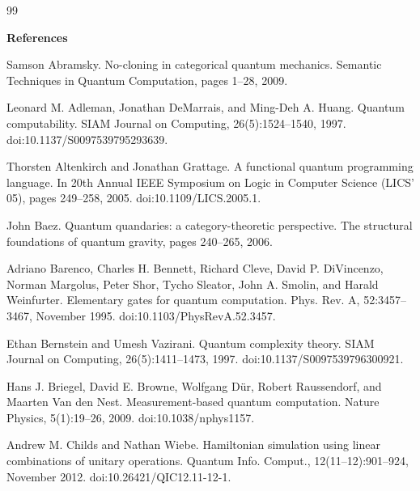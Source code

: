 \documentclass[10pt,a4paper]{amsart}
\begin{document}
\begin{thebibliography}{99}

 
\par\medskip\noindent\textbf{References}\par
  
\par\noindent  [1]  Samson Abramsky.  No-cloning in categorical quantum mechanics.  Semantic Techniques in Quantum Computation, pages 1–28, 2009.  
 
\par\noindent  [2]  Leonard M. Adleman, Jonathan DeMarrais, and Ming-Deh A. Huang.  Quantum computability.  SIAM Journal on Computing, 26(5):1524–1540, 1997.  doi:10.1137/S0097539795293639.  
 
\par\noindent  [3]  Thorsten Altenkirch and Jonathan Grattage.  A functional quantum programming language.  In 20th Annual IEEE Symposium on Logic in Computer Science (LICS’ 05), pages 249–258, 2005.  doi:10.1109/LICS.2005.1.  
 
\par\noindent  [4]  John Baez.  Quantum quandaries: a category-theoretic perspective.  The structural foundations of quantum gravity, pages 240–265, 2006.  
 
\par\noindent  [5]  Adriano Barenco, Charles H. Bennett, Richard Cleve, David P. DiVincenzo, Norman Margolus, Peter Shor, Tycho Sleator, John A. Smolin, and Harald Weinfurter.  Elementary gates for quantum computation.  Phys. Rev. A, 52:3457–3467, November 1995.  doi:10.1103/PhysRevA.52.3457.  
 
\par\noindent  [6]  Ethan Bernstein and Umesh Vazirani.  Quantum complexity theory.  SIAM Journal on Computing, 26(5):1411–1473, 1997.  doi:10.1137/S0097539796300921.  
 
\par\noindent  [7]  Hans J. Briegel, David E. Browne, Wolfgang Dür, Robert Raussendorf, and Maarten Van den Nest.  Measurement-based quantum computation.  Nature Physics, 5(1):19–26, 2009.  doi:10.1038/nphys1157.  
 
\par\noindent  [8]  Andrew M. Childs and Nathan Wiebe.  Hamiltonian simulation using linear combinations of unitary operations.  Quantum Info. Comput., 12(11–12):901–924, November 2012.  doi:10.26421/QIC12.11-12-1.  
 

\end{thebibliography}
\end{document}
